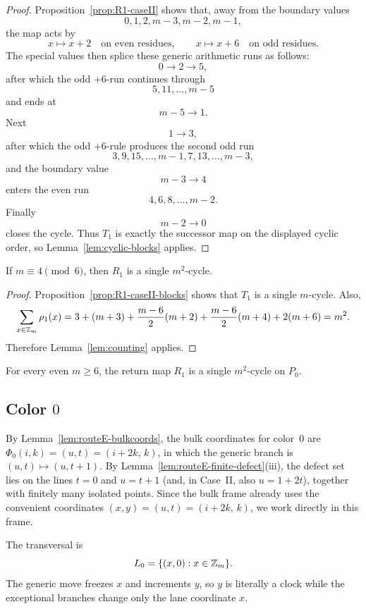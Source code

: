 \begin{proof}
Proposition~\ref{prop:R1-caseII} shows that, away from the boundary values
\[
0,1,2,m-3,m-2,m-1,
\]
the map acts by
\[
x\mapsto x+2\quad\text{on even residues},\qquad x\mapsto x+6\quad\text{on odd residues}.
\]
The special values then splice these generic arithmetic runs as follows:
\[
0\to 2\to 5,
\]
after which the odd $+6$-run continues through
\[
5,11,\dots,m-5
\]
and ends at
\[
m-5\to 1.
\]
Next
\[
1\to 3,
\]
after which the odd $+6$-rule produces the second odd run
\[
3,9,15,\dots,m-1,7,13,\dots,m-3,
\]
and the boundary value
\[
m-3\to 4
\]
enters the even run
\[
4,6,8,\dots,m-2.
\]
Finally
\[
m-2\to 0
\]
closes the cycle.
Thus $T_1$ is exactly the successor map on the displayed cyclic order, so Lemma~\ref{lem:cyclic-blocks} applies.
\end{proof}

\begin{corollary}\label{cor:R1-caseII}
If $m\equiv 4\pmod 6$, then $R_1$ is a single $m^2$-cycle.
\end{corollary}

\begin{proof}
Proposition~\ref{prop:R1-caseII-blocks} shows that $T_1$ is a single $m$-cycle.
Also,
\[
\sum_{x\in \mathbb Z_m}\rho_1(x)
=
3+(m+3)+\frac{m-6}{2}(m+2)+\frac{m-6}{2}(m+4)+2(m+6)=m^2.
\]
Therefore Lemma~\ref{lem:counting} applies.
\end{proof}

\begin{corollary}\label{cor:R1-all}
For every even $m\ge 6$, the return map $R_1$ is a single $m^2$-cycle on $P_0$.
\end{corollary}


\subsection{Color $0$}

By Lemma~\ref{lem:routeE-bulkcoords}, the bulk coordinates for color~$0$ are $\Phi_0(i,k)=(u,t)=(i+2k,\,k)$, in which the generic branch is $(u,t)\mapsto(u,t+1)$.
By Lemma~\ref{lem:routeE-finite-defect}\textup{(iii)}, the defect set lies on the lines $t=0$ and $u=t+1$ (and, in Case~II, also $u=1+2t$), together with finitely many isolated points.
Since the bulk frame already uses the convenient coordinates $(x,y)=(u,t)=(i+2k,\,k)$, we work directly in this frame.

The transversal is
\[
L_0=\{(x,0):x\in \mathbb Z_m\}.
\]
The generic move freezes $x$ and increments $y$, so $y$ is literally a clock while the exceptional branches change only the lane coordinate $x$.


